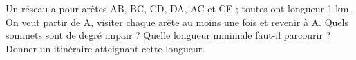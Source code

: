 \documentclass[11pt]{article}
\begin{document}
Un réseau a pour arêtes AB, BC, CD, DA, AC et CE ; toutes ont longueur 1 km. On veut partir de A, visiter chaque arête au moins une fois et revenir à A. Quels sommets sont de degré impair ? Quelle longueur minimale faut-il parcourir ? Donner un itinéraire atteignant cette longueur.\par
\vspace{5pt}
\end{document}
